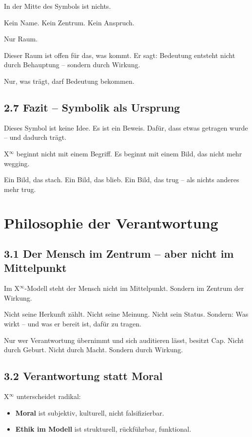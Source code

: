 \documentclass[12pt,a4paper]{book}
\begin{document}
In der Mitte des Symbols ist nichts.

Kein Name. Kein Zentrum. Kein Anspruch.

Nur Raum.

Dieser Raum ist offen für das, was kommt.  
Er sagt: Bedeutung entsteht nicht durch Behauptung – sondern durch Wirkung.

Nur, was trägt, darf Bedeutung bekommen.

\section*{2.7 Fazit – Symbolik als Ursprung}

Dieses Symbol ist keine Idee.  
Es ist ein Beweis. Dafür, dass etwas getragen wurde – und dadurch trägt.

X$^\infty$ beginnt nicht mit einem Begriff.  
Es beginnt mit einem Bild, das nicht mehr wegging.

Ein Bild, das stach.  
Ein Bild, das blieb.  
Ein Bild, das trug – als nichts anderes mehr trug.

\chapter{Philosophie der Verantwortung}

\section*{3.1 Der Mensch im Zentrum – aber nicht im Mittelpunkt}

Im X$^\infty$-Modell steht der Mensch nicht im Mittelpunkt.  
Sondern im Zentrum der Wirkung.

Nicht seine Herkunft zählt. Nicht seine Meinung. Nicht sein Status.  
Sondern: Was wirkt – und was er bereit ist, dafür zu tragen.

Nur wer Verantwortung übernimmt und sich auditieren lässt, besitzt Cap.  
Nicht durch Geburt. Nicht durch Macht. Sondern durch Wirkung.

\section*{3.2 Verantwortung statt Moral}

X$^\infty$ unterscheidet radikal:

\begin{itemize}
    \item \textbf{Moral} ist subjektiv, kulturell, nicht falsifizierbar.
    \item \textbf{Ethik im Modell} ist strukturell, rückführbar, funktional.
\end{itemize}
\end{document}
